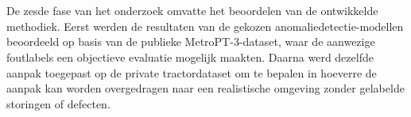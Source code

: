 


\section{}%
\label{sec: Vergelijken en evalueren van de methodiek op de beide datasets}

De zesde fase van het onderzoek omvatte het beoordelen van de ontwikkelde methodiek. Eerst werden de resultaten van de gekozen anomaliedetectie-modellen beoordeeld op basis van de publieke MetroPT-3-dataset, waar de aanwezige foutlabels een objectieve evaluatie mogelijk maakten. Daarna werd dezelfde aanpak toegepast op de private tractordataset om te bepalen in hoeverre de aanpak kan worden overgedragen naar een realistische omgeving zonder gelabelde storingen of defecten.



